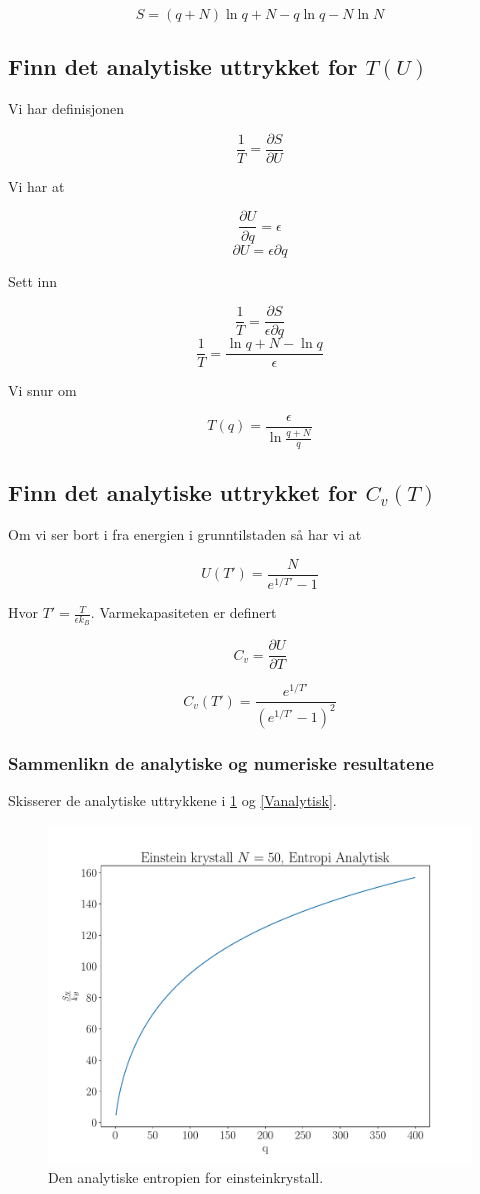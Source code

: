 \documentclass[ reprint, amsmath,amssymb, aps]{revtex4-2}
\begin{document}
$$ S = (q+N)\ln{q+N} - q \ln{q} - N\ln{N}$$


\subsection*{Finn det analytiske uttrykket for $T(U)$}

Vi har definisjonen

$$ \frac{1}{T} = \frac{\partial S}{\partial U}$$

Vi har at

$$\frac{\partial U}{\partial q} = \epsilon$$
$$\partial U = \epsilon \partial q$$

Sett inn

$$\frac{1}{T} = \frac{\partial S}{\epsilon \partial q}$$
$$\frac{1}{T} = \frac{\ln{q+N} - \ln{q}}{\epsilon}$$

Vi snur om

$$T(q) = \frac{\epsilon}{\ln{\frac{q+N}{q}}}$$

\subsection*{Finn det analytiske uttrykket for $C_v(T)$}

Om vi ser bort i fra energien i grunntilstaden så har vi at 

$$U(T') = \frac{N}{e^{1/T'} -1}$$

Hvor $T' = \frac{T}{\epsilon k_B}$. Varmekapasiteten er definert

$$C_v = \frac{\partial U}{\partial T}$$

$$C_v(T') = \frac{e^{1/T'}}{(e^{1/T'} - 1)^2}$$

\subsubsection*{Sammenlikn de analytiske og numeriske resultatene}

Skisserer de analytiske uttrykkene i \ref{Sanalytisk} og \ref{Vanalytisk}.

\begin{figure}
\centering
\includegraphics[scale=0.35]{Sanalytisk.pdf}
\caption{Den analytiske entropien for einsteinkrystall.}
\label{Sanalytisk}
\end{figure}
\end{document}
